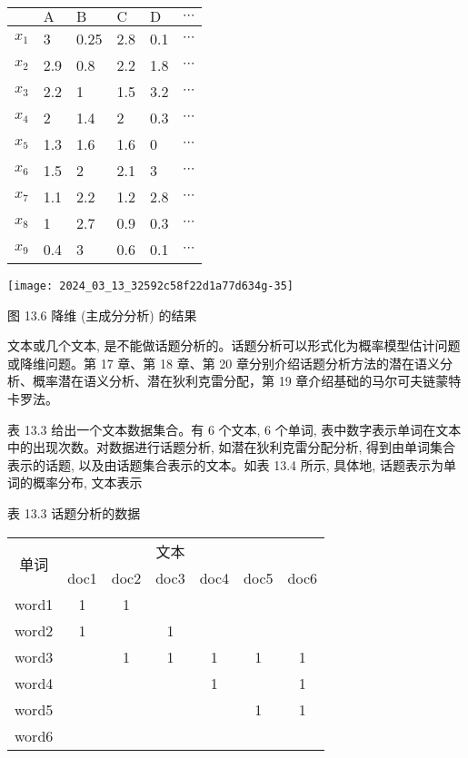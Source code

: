 \documentclass[10pt]{article}
\begin{document}
\begin{CJK*}{UTF8}{bsmi}
\begin{center}
\begin{tabular}{llllll}
\hline
 & $\mathrm{A}$ & $\mathrm{B}$ & $\mathrm{C}$ & $\mathrm{D}$ & $\cdots$ \\
\hline
$x_{1}$ & 3 & 0.25 & 2.8 & 0.1 & $\cdots$ \\
$x_{2}$ & 2.9 & 0.8 & 2.2 & 1.8 & $\cdots$ \\
$x_{3}$ & 2.2 & 1 & 1.5 & 3.2 & $\cdots$ \\
$x_{4}$ & 2 & 1.4 & 2 & 0.3 & $\cdots$ \\
$x_{5}$ & 1.3 & 1.6 & 1.6 & 0 & $\cdots$ \\
$x_{6}$ & 1.5 & 2 & 2.1 & 3 & $\cdots$ \\
$x_{7}$ & 1.1 & 2.2 & 1.2 & 2.8 & $\cdots$ \\
$x_{8}$ & 1 & 2.7 & 0.9 & 0.3 & $\cdots$ \\
$x_{9}$ & 0.4 & 3 & 0.6 & 0.1 & $\cdots$ \\
\hline
\end{tabular}
\end{center}

\begin{center}
\texttt{[image: 2024\_03\_13\_32592c58f22d1a77d634g-35]}
\end{center}

图 13.6 降维 (主成分分析) 的结果

文本或几个文本, 是不能做话题分析的。话题分析可以形式化为概率模型估计问题或降维问题。第 17 章、第 18 章、第 20 章分别介绍话题分析方法的潜在语义分析、概率潜在语义分析、潜在狄利克雷分配，第 19 章介绍基础的马尔可夫链蒙特卡罗法。

表 13.3 给出一个文本数据集合。有 6 个文本, 6 个单词, 表中数字表示单词在文本中的出现次数。对数据进行话题分析, 如潜在狄利克雷分配分析, 得到由单词集合表示的话题, 以及由话题集合表示的文本。如表 13.4 所示, 具体地, 话题表示为单词的概率分布, 文本表示

表 13.3 话题分析的数据

\begin{center}
\begin{tabular}{c|cccccc}
\hline
\multirow{2}{*}{单词} & \multicolumn{5}{|c}{文本} &  \\
\cline { 2 - 6 }
 & doc1 & doc2 & doc3 & doc4 & doc5 & doc6 \\
\hline
word1 & 1 & 1 &  &  &  &  \\
word2 & 1 &  & 1 &  &  &  \\
word3 &  & 1 & 1 & 1 & 1 & 1 \\
word4 &  &  &  & 1 &  & 1 \\
word5 &  &  &  &  & 1 & 1 \\
word6 &  &  &  &  &  &  \\
\hline
\end{tabular}
\end{center}


\end{CJK*}
\end{document}
